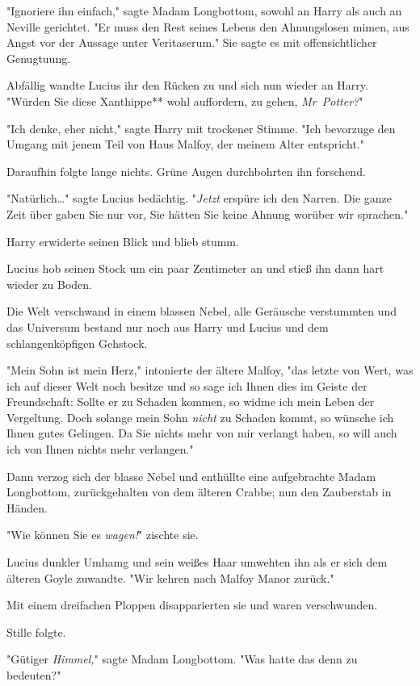 {"Ignoriere ihn einfach," sagte Madam Longbottom, sowohl an Harry als auch an Neville gerichtet. "Er muss den Rest seines Lebens den Ahnungslosen mimen, aus Angst vor der Aussage unter Veritaserum." Sie sagte es mit offensichtlicher Genugtuung.

Abfällig wandte Lucius ihr den Rücken zu und sich nun wieder an Harry. "Würden Sie diese Xanthippe** wohl auffordern, zu gehen, \emph{Mr~Potter?}"

"Ich denke, eher nicht," sagte Harry mit trockener Stimme. "Ich bevorzuge den Umgang mit jenem Teil von Haus Malfoy, der meinem Alter entspricht."

Daraufhin folgte lange nichts. Grüne Augen durchbohrten ihn forschend.

"Natürlich…" sagte Lucius bedächtig. "\emph{Jetzt} erspüre ich den Narren. Die ganze Zeit über gaben Sie nur vor, Sie hätten Sie keine Ahnung worüber wir sprachen."

Harry erwiderte seinen Blick und blieb stumm.

Lucius hob seinen Stock um ein paar Zentimeter an und stieß ihn dann hart wieder zu Boden.

Die Welt verschwand in einem blassen Nebel, alle Geräusche verstummten und das Universum bestand nur noch aus Harry und Lucius und dem schlangenköpfigen Gehstock.

"Mein Sohn ist mein Herz," intonierte der ältere Malfoy, "das letzte von Wert, was ich auf dieser Welt noch besitze und so sage ich Ihnen dies im Geiste der Freundschaft: Sollte er zu Schaden kommen, so widme ich mein Leben der Vergeltung. Doch solange mein Sohn \emph{nicht} zu Schaden kommt, so wünsche ich Ihnen gutes Gelingen. Da Sie nichts mehr von mir verlangt haben, so will auch ich von Ihnen nichts mehr verlangen."

Dann verzog sich der blasse Nebel und enthüllte eine aufgebrachte Madam Longbottom, zurückgehalten von dem älteren Crabbe; nun den Zauberstab in Händen.

"Wie können Sie es \emph{wagen!}" zischte sie.

Lucius dunkler Umhamg und sein weißes Haar umwehten ihn als er sich dem älteren Goyle zuwandte. "Wir kehren nach Malfoy Manor zurück."

Mit einem dreifachen Ploppen disapparierten sie und waren verschwunden.

Stille folgte.

"Gütiger \emph{Himmel,}" sagte Madam Longbottom. "Was hatte das denn zu bedeuten?"

}
